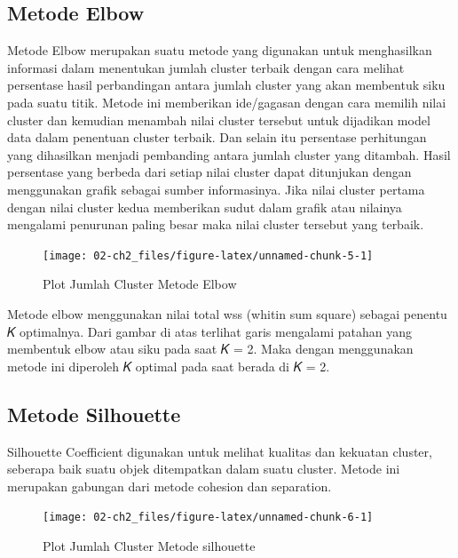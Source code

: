 \documentclass[
  oneside]{book}
\begin{document}
\subsection*{Metode Elbow}\label{metode-elbow}

Metode Elbow merupakan suatu metode yang digunakan untuk menghasilkan informasi dalam menentukan jumlah cluster terbaik dengan cara melihat persentase hasil perbandingan antara jumlah cluster yang akan membentuk siku pada suatu titik. Metode ini memberikan ide/gagasan dengan cara memilih nilai cluster dan kemudian menambah nilai cluster tersebut untuk dijadikan model data dalam penentuan cluster terbaik. Dan selain itu persentase perhitungan yang dihasilkan menjadi pembanding antara jumlah cluster yang ditambah. Hasil persentase yang berbeda dari setiap nilai cluster dapat ditunjukan dengan menggunakan grafik sebagai sumber informasinya. Jika nilai cluster pertama dengan nilai cluster kedua memberikan sudut dalam grafik atau nilainya mengalami penurunan paling besar maka nilai cluster tersebut yang terbaik.

\begin{figure}[h]

{\centering \texttt{[image: 02-ch2\_files/figure-latex/unnamed-chunk-5-1]} 

}

\caption{Plot Jumlah Cluster Metode Elbow}\label{fig:unnamed-chunk-5}
\end{figure}

Metode elbow menggunakan nilai total wss (whitin sum square) sebagai penentu 𝐾 optimalnya. Dari gambar di atas terlihat garis mengalami patahan yang membentuk elbow atau siku pada saat 𝐾 = 2. Maka dengan menggunakan metode ini diperoleh 𝐾 optimal pada saat berada di 𝐾 = 2.

\subsection*{Metode Silhouette}\label{metode-silhouette}

Silhouette Coefficient digunakan untuk melihat kualitas dan kekuatan cluster, seberapa baik suatu objek ditempatkan dalam suatu cluster. Metode ini merupakan gabungan dari metode cohesion dan separation.

\begin{figure}[h]

{\centering \texttt{[image: 02-ch2\_files/figure-latex/unnamed-chunk-6-1]} 

}

\caption{Plot Jumlah Cluster Metode silhouette}\label{fig:unnamed-chunk-6}
\end{figure}
\end{document}
